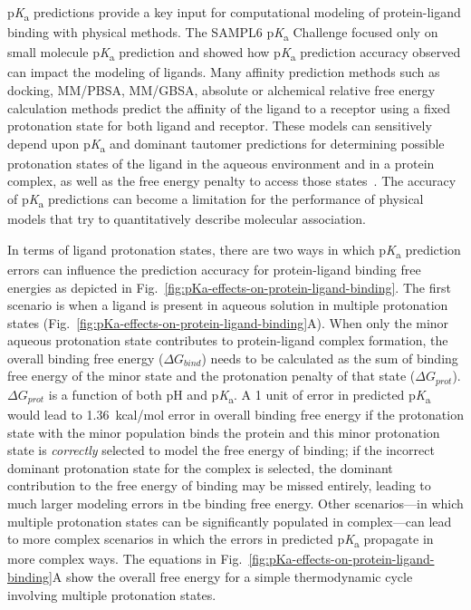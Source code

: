 \documentclass[9pt,lineno,final]{elife}
\newcommand{\pKa}{p\textit{K}\textsubscript{a}}
\begin{document}
\pKa{} predictions provide a key input for computational modeling of protein-ligand binding with physical methods.
The SAMPL6 \pKa{} Challenge focused only on small molecule \pKa{} prediction and showed how \pKa{} prediction accuracy observed can impact the modeling of ligands.
Many affinity prediction methods such as docking,  MM/PBSA, MM/GBSA, absolute or alchemical relative free energy calculation methods predict the affinity of the ligand to a receptor using a fixed protonation state for both ligand and receptor.
These models can sensitively depend upon \pKa{} and dominant tautomer predictions for determining possible protonation states of the ligand in the aqueous environment and in a protein complex, as well as the free energy penalty to access those states~\citep{deOliveira:2019:J.Chem.TheoryComput.}. 
The accuracy of \pKa{} predictions can become a limitation for the performance of physical models that try to quantitatively describe molecular association.

In terms of ligand protonation states, there are two ways in which \pKa{} prediction errors can influence the prediction accuracy for protein-ligand binding free energies as depicted in Fig.~\ref{fig:pKa-effects-on-protein-ligand-binding}. 
The first scenario is when a ligand is present in aqueous solution in multiple protonation states (Fig.~\ref{fig:pKa-effects-on-protein-ligand-binding}A).
When only the minor aqueous protonation state contributes to protein-ligand complex formation, the overall binding free energy ($\Delta G_{bind}$) needs to be calculated as the sum of binding free energy of the minor state and the protonation penalty of that state ($\Delta G_{prot}$). 
$\Delta G_{prot}$ is a function of both pH and \pKa{}.
A 1 unit of error in predicted \pKa{} would lead to 1.36~kcal/mol error in overall binding free energy if the protonation state with the minor population binds the protein and this minor protonation state is \emph{correctly} selected to model the free energy of binding; if the incorrect dominant protonation state for the complex is selected, the dominant contribution to the free energy of binding may be missed entirely, leading to much larger modeling errors in tbe binding free energy. 
Other scenarios---in which multiple protonation states can be significantly populated in complex---can lead to more complex scenarios in which the errors in predicted \pKa{} propagate in more complex ways.
The equations in Fig.~\ref{fig:pKa-effects-on-protein-ligand-binding}A show the overall free energy for a simple thermodynamic cycle involving multiple protonation states.
\end{document}
